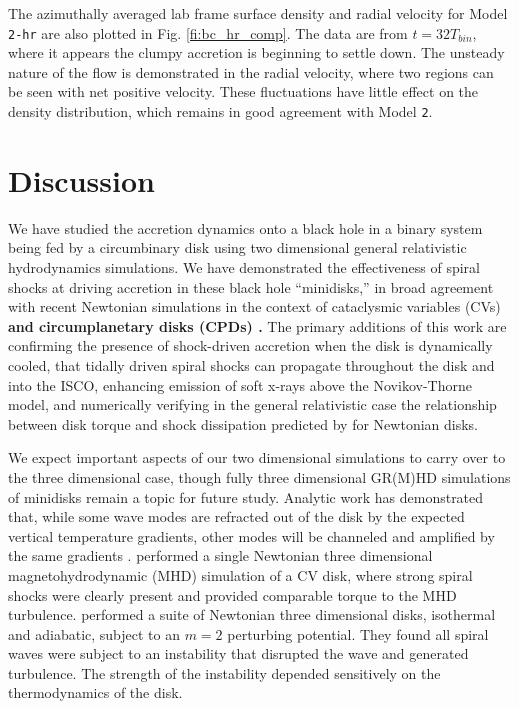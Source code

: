 \documentclass{emulateapj}
\newcommand{\model}[1]{{Model \texttt{#1}}}
\begin{document}
The azimuthally averaged lab frame surface density and radial velocity for \model{2-hr} are also plotted in Fig. \ref{fi:bc_hr_comp}.  The data are from $t = 32T_{bin}$, where it appears the clumpy accretion is beginning to settle down.  The unsteady nature of the flow is demonstrated in the radial velocity, where two regions can be seen with net positive velocity.  These fluctuations have little effect on the density distribution, which remains in good agreement with \model{2}.



\section{Discussion}
\label{sec:discussion}

We have studied the accretion dynamics onto a black hole in a binary system being fed by a circumbinary disk using two dimensional general relativistic hydrodynamics simulations. We have demonstrated the effectiveness of spiral shocks at driving accretion in these black hole ``minidisks,'' in broad agreement with recent Newtonian simulations in the context of cataclysmic variables (CVs) \citep{Ju16} {\bf and circumplanetary disks (CPDs) \citep{Zhu16}.}  The primary additions of this work are confirming the presence of shock-driven accretion when the disk is dynamically cooled, that tidally driven spiral shocks can propagate throughout the disk and into the ISCO, enhancing emission of soft x-rays above the Novikov-Thorne model, and numerically verifying in the general relativistic case the relationship between disk torque and shock dissipation predicted by \cite{Rafikov16} for Newtonian disks.

We expect important aspects of our two dimensional simulations to carry over to the three dimensional case, though fully three dimensional GR(M)HD simulations of minidisks remain a topic for future study.  Analytic work has demonstrated that, while some wave modes are refracted out of the disk by the expected vertical temperature gradients, other modes will be channeled and amplified by the same gradients \citep{Lubow98}. \cite{Ju16} performed a single Newtonian three dimensional magnetohydrodynamic (MHD) simulation of a CV disk, where strong spiral shocks were clearly present and provided comparable torque to the MHD turbulence.  \cite{Bae16} performed a suite of Newtonian three dimensional disks, isothermal and adiabatic, subject to an $m=2$ perturbing potential.  They found all spiral waves were subject to an instability that disrupted the wave and generated turbulence.  The strength of the instability depended sensitively on the thermodynamics of the disk.
\end{document}
